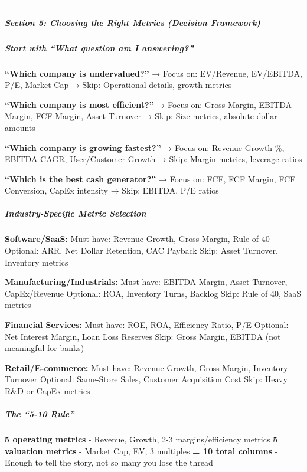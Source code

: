 \documentclass[11pt]{article}
\begin{document}
\vspace{0.5em}\hrule\vspace{0.5em}

\subparagraph{Section 5: Choosing the Right Metrics (Decision Framework)}\mbox{}\par

\subparagraph{Start with ``What question am I answering?''}\mbox{}\par

\textbf{``Which company is undervalued?''} → Focus on: EV/Revenue, EV/EBITDA, P/E, Market Cap → Skip: Operational details, growth metrics


\textbf{``Which company is most efficient?''} → Focus on: Gross Margin, EBITDA Margin, FCF Margin, Asset Turnover → Skip: Size metrics, absolute dollar amounts


\textbf{``Which company is growing fastest?''} → Focus on: Revenue Growth \%, EBITDA CAGR, User/Customer Growth → Skip: Margin metrics, leverage ratios


\textbf{``Which is the best cash generator?''} → Focus on: FCF, FCF Margin, FCF Conversion, CapEx intensity → Skip: EBITDA, P/E ratios


\subparagraph{Industry-Specific Metric Selection}\mbox{}\par

\textbf{Software/SaaS:} Must have: Revenue Growth, Gross Margin, Rule of 40 Optional: ARR, Net Dollar Retention, CAC Payback Skip: Asset Turnover, Inventory metrics


\textbf{Manufacturing/Industrials:} Must have: EBITDA Margin, Asset Turnover, CapEx/Revenue Optional: ROA, Inventory Turns, Backlog Skip: Rule of 40, SaaS metrics


\textbf{Financial Services:} Must have: ROE, ROA, Efficiency Ratio, P/E Optional: Net Interest Margin, Loan Loss Reserves Skip: Gross Margin, EBITDA (not meaningful for banks)


\textbf{Retail/E-commerce:} Must have: Revenue Growth, Gross Margin, Inventory Turnover Optional: Same-Store Sales, Customer Acquisition Cost Skip: Heavy R\&D or CapEx metrics


\subparagraph{The ``5-10 Rule''}\mbox{}\par

\textbf{5 operating metrics} - Revenue, Growth, 2-3 margins/efficiency metrics \textbf{5 valuation metrics} - Market Cap, EV, 3 multiples \textbf{= 10 total columns} - Enough to tell the story, not so many you lose the thread
\end{document}

